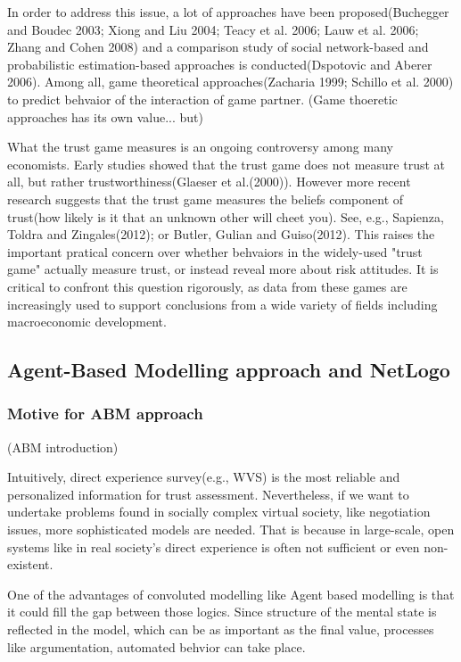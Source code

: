 \documentclass[11pt]{article}
\begin{document}
In order to address this issue, a lot of approaches have been proposed(Buchegger and Boudec 2003; Xiong and Liu 2004; Teacy et al. 2006; Lauw et al. 2006; Zhang and Cohen 2008) and a comparison study of social network-based  and probabilistic estimation-based approaches is conducted(Dspotovic and Aberer 2006). Among all, game theoretical approaches(Zacharia 1999; Schillo et al. 2000) to predict behvaior of the interaction of game partner. (Game thoeretic approaches has its own value... but)
  
What the trust game measures is an ongoing controversy among many economists. Early studies showed that the trust game does not measure trust at all, but rather trustworthiness(Glaeser et al.(2000)). However more recent research suggests that the trust game measures the beliefs component of trust(how likely is it that an unknown other will cheet you). See, e.g., Sapienza, Toldra and Zingales(2012); or Butler, Gulian and Guiso(2012). This raises the important pratical concern over whether behvaiors in the widely-used "trust game" actually measure trust, or instead reveal more about risk attitudes. It is critical to confront this question rigorously, as data from these games are increasingly used to support conclusions from a wide variety of fields including macroeconomic development.


\subsection{Agent-Based Modelling approach and NetLogo}
\subsubsection{Motive for ABM approach}

(ABM introduction)

Intuitively, direct experience survey(e.g., WVS) is the most reliable and personalized information for trust assessment. Nevertheless, if we want to undertake problems found in socially complex virtual society, like negotiation issues, more sophisticated models are needed. That is because in large-scale, open systems like in real society's direct experience is often not sufficient or even non-existent.

One of the advantages of convoluted modelling like Agent based modelling is that it could fill the gap between those logics. Since structure of the mental state is reflected in the model, which can be as important as the final value, processes like argumentation, automated behvior can take place.
\end{document}
